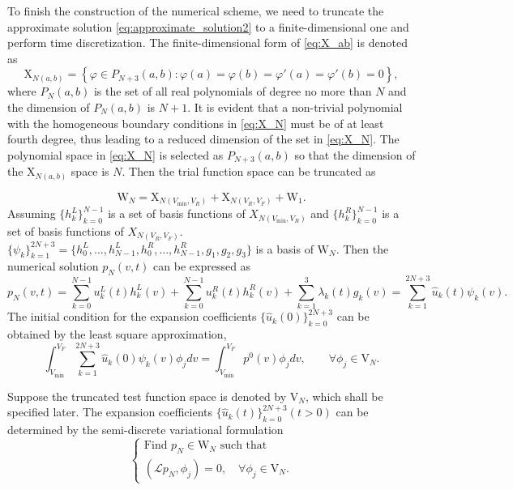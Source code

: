 To finish the construction of the numerical scheme, we need to truncate the approximate solution \eqref{eq:approximate_solution2} to a finite-dimensional one and perform time discretization. The finite-dimensional form of \eqref{eq:X_ab} is denoted as
\begin{equation}
\label{eq:X_N}
    \mathrm{X}_{N(a,b)}=\left\{\varphi \in P_{N+3}(a,b) : \varphi(a)=\varphi(b)=\varphi'(a)=\varphi'(b)=0   \right\},
\end{equation}
where $P_N(a,b)$ is the set of all real polynomials of degree no more than $N$ and the dimension of $P_N{(a,b)}$ is $N+1$. It is evident that a  non-trivial polynomial with the homogeneous boundary conditions in \eqref{eq:X_N} must be of at least fourth degree, thus leading to a reduced dimension of the set in \eqref{eq:X_N}. The polynomial space in \eqref{eq:X_N} is selected as $P_{N+3}(a,b)$ so that the dimension of the $\mathrm{X}_{N(a,b)}$ space is $N$. Then the trial function space can be truncated as

\begin{equation}
    \label{eq:trial_function}
    \mathrm{W}_N=\mathrm{X}_{N(V_{\min},V_R)} + \mathrm{X}_{N(V_R,V_F)} + \mathrm{W}_1.
\end{equation}
Assuming $\{h^L_k\}_{k=0}^{N-1}$ is a set
of basis functions of $X_{N(V_{\min},V_R)}$ and $\{h^R_k\}_{k=0}^{N-1}$ is a set
of basis functions of $X_{N(V_R,V_F)}$. $\{\psi_k\}_{k=1}^{2N+3}=\{h^L_0,...,h^L_{N-1},h^R_0,...,h^R_{N-1},g_1,g_2,g_3\}$ is a basis of $\mathrm{W}_N$. Then the numerical solution $p_N(v,t)$ can be expressed as
\begin{equation}
    \label{eq:approximate_solution3}
    p_N(v,t)=\sum_{k=0}^{N-1} u_k^L(t)h^L_k(v)+\sum_{k=0}^{N-1} u_k^R(t)h^R_k(v)+\sum_{k=1}^3 \lambda_k(t)g_k(v)=\sum_{k=1}^{2N+3}\hat{u}_k(t)\psi_k(v).
\end{equation}
 The initial condition for the expansion coefficients $\{\hat{u}_{k}(0)\}_{k=0}^{2N+3}$ can be obtained by the least square approximation,
\begin{equation}
    \label{eq:initial_vector2}
    \int_{V_{\min}}^{V_F} \sum_{k=1}^{2N+3}\hat{u}_k(0)\psi_k(v) \phi_j dv=\int_{V_{\min}}^{V_F} p^0(v)\phi_j dv, \qquad \forall \phi_j \in \mathrm{V}_N.
\end{equation}

Suppose the truncated test function space is denoted by $\mathrm{V}_N$, which shall be specified later. The expansion coefficients $\{\hat{u}_k(t)\}_{k=0}^{2N+3}(t>0)$ can be determined by the semi-discrete variational formulation
\begin{equation}
    \label{eq:variational_form2}
    \begin{cases}
        \text{Find } p_N\in \mathrm{W}_{N} \text{ such that}\\
        (\mathcal{L}p_N,\phi_j)=0,\quad \forall \phi_j \in \mathrm{V}_N.
    \end{cases}
\end{equation}


